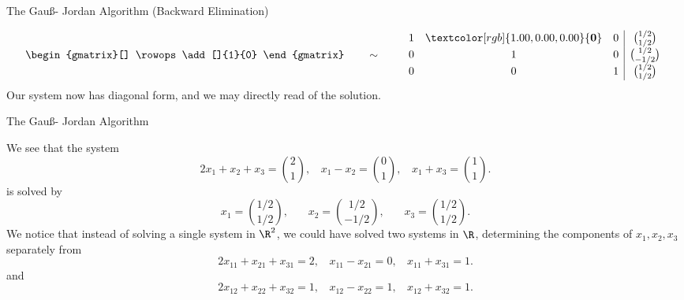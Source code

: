 \documentclass[smaller,hyperref={CJKbookmarks=true}]{beamer}
\begin{document}
\begin{frame}[c]{The Gau\ss - Jordan Algorithm (Backward Elimination)}
\begin{spacing}{1}
\begin{equation*}
\begin{gmatrix}[]
    \rowops
    \add[]{1}{0}
  \end{gmatrix}
  \qquad\sim\qquad
  \begin{array}{ccc|c}
    1 & \textcolor[rgb]{1.00,0.00,0.00}{\textbf{0}} & 0 & \binom{1/2}{1/2} \\
    0 & 1 & 0 & \binom{1/2}{-1/2} \\
    0 & 0 & 1 & \binom{1/2}{1/2}
  \end{array}
\end{equation*}
Our system now has diagonal form, and we may directly read of the
solution.
\end{spacing}
\end{frame}
\begin{frame}[t,shrink]{The Gau\ss - Jordan Algorithm} \begin{spacing}{1}
We see that the system
\[2x_1+x_2+x_3=\binom{2}{1},~~~~x_1-x_2=\binom{0}{1},~~~~x_1+x_3=\binom{1}{1}.\]
is solved by
\[x_1=\binom{1/2}{1/2},~~~~~~~~x_2=\binom{1/2}{-1/2},~~~~~~~~x_3=\binom{1/2}{1/2}.\]
We notice that instead of solving a single system in $\R^2$, we could have solved two systems in $\R$, determining the components of $x_1,x_2,x_3$ separately from
\[2x_{11}+x_{21}+x_{31}=2,~~~~x_{11}-x_{21}=0,~~~~x_{11}+x_{31}=1.\]
and
\[2x_{12}+x_{22}+x_{32}=1,~~~~x_{12}-x_{22}=1,~~~~x_{12}+x_{32}=1.\]
\end{spacing}
\end{frame}
\end{document}
